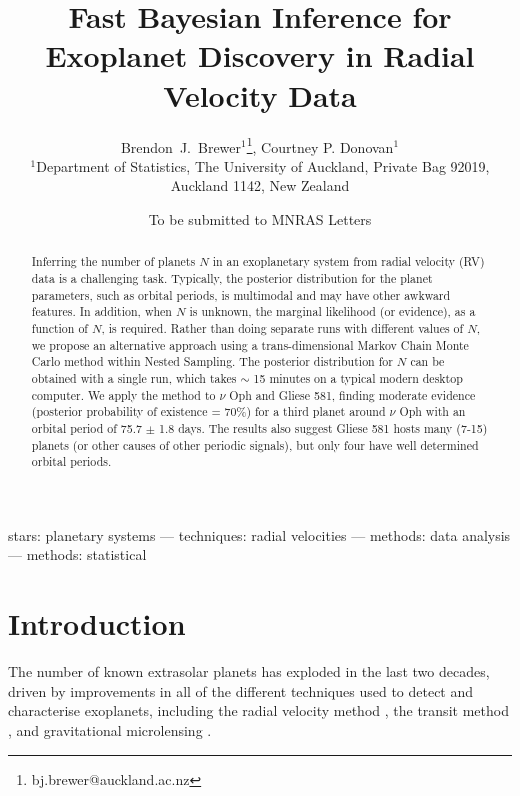 \documentclass[useAMS,usenatbib]{mn2e}
\title[]
{Fast Bayesian Inference for Exoplanet Discovery in Radial Velocity Data}
\author[Brewer]{%
  Brendon~J.~Brewer$^{1}$\thanks{bj.brewer@auckland.ac.nz},
  Courtney P. Donovan$^{1}$
  \medskip\\
  $^1$Department of Statistics, The University of Auckland, Private Bag 92019, Auckland 1142, New Zealand}
\begin{document}
             
\date{To be submitted to MNRAS Letters}
             
\maketitle

\label{firstpage}


\begin{abstract}
Inferring the number of planets $N$ in an exoplanetary system from radial velocity
(RV) data is a challenging task. Typically, the posterior distribution for the
planet parameters, such as orbital periods,
is multimodal and may have other awkward features. In
addition, when $N$ is unknown, the marginal likelihood (or evidence), as a
function of $N$, is required. Rather than doing separate runs with different
values of $N$, we propose an alternative
approach using a trans-dimensional Markov Chain Monte Carlo method within
Nested Sampling. The posterior distribution for $N$ can be obtained with a
single run, which takes $\sim$ 15 minutes on a typical modern desktop computer.
We apply the method to $\nu$ Oph and Gliese 581, finding moderate evidence
(posterior probability of existence = 70\%) for a third planet around
$\nu$ Oph with an orbital period of 75.7 $\pm$ 1.8 days. The results also
suggest Gliese 581 hosts many (7-15) planets (or other causes of other periodic
signals), but only four have well determined orbital periods. 
\end{abstract}

\begin{keywords}
stars: planetary systems --- techniques: radial velocities ---
methods: data analysis --- methods: statistical
\end{keywords}


\section{Introduction}
The number of known extrasolar planets has exploded in the last two
decades, driven by improvements in
all of the different techniques used to detect and characterise exoplanets,
including the radial velocity method \citep[e.g.][]{},
the transit method \citep[e.g.]{},
and gravitational microlensing
\citep[e.g.][]{2014ApJ...785..155B, 2014ApJ...790...14Y}.
\end{document}
